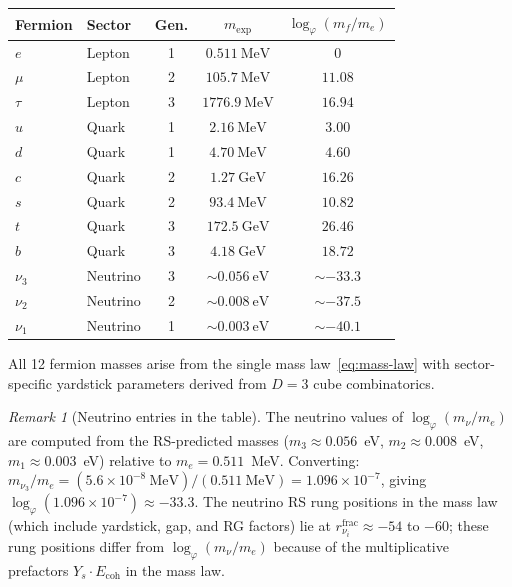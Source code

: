 \documentclass[12pt,a4paper]{article}
\theoremstyle{definition}
\theoremstyle{remark}
\newtheorem{remark}[theorem]{Remark}
\begin{document}
\begin{center}
\renewcommand{\arraystretch}{1.3}
\begin{tabular}{@{}llccc@{}}
\toprule
\textbf{Fermion} & \textbf{Sector} & \textbf{Gen.} &
\textbf{$m_{\mathrm{exp}}$} &
\textbf{$\log_\varphi(m_f/m_e)$} \\
\midrule
$e$ & Lepton & 1 & $0.511~\mathrm{MeV}$ & 0 \\
$\mu$ & Lepton & 2 & $105.7~\mathrm{MeV}$ & $11.08$ \\
$\tau$ & Lepton & 3 & $1776.9~\mathrm{MeV}$ & $16.94$ \\
\midrule
$u$ & Quark & 1 & $2.16~\mathrm{MeV}$ & $3.00$ \\
$d$ & Quark & 1 & $4.70~\mathrm{MeV}$ & $4.60$ \\
$c$ & Quark & 2 & $1.27~\mathrm{GeV}$ & $16.26$ \\
$s$ & Quark & 2 & $93.4~\mathrm{MeV}$ & $10.82$ \\
$t$ & Quark & 3 & $172.5~\mathrm{GeV}$ & $26.46$ \\
$b$ & Quark & 3 & $4.18~\mathrm{GeV}$ & $18.72$ \\
\midrule
$\nu_3$ & Neutrino & 3 & $\sim 0.056~\mathrm{eV}$ &
$\sim -33.3$ \\
$\nu_2$ & Neutrino & 2 & $\sim 0.008~\mathrm{eV}$ &
$\sim -37.5$ \\
$\nu_1$ & Neutrino & 1 & $\sim 0.003~\mathrm{eV}$ &
$\sim -40.1$ \\
\bottomrule
\end{tabular}
\end{center}

All 12 fermion masses arise from the single mass
law~\eqref{eq:mass-law} with sector-specific yardstick
parameters derived from $D = 3$ cube combinatorics.

\begin{remark}[Neutrino entries in the table]
The neutrino values of $\log_\varphi(m_\nu/m_e)$ are computed
from the RS-predicted masses ($m_3 \approx 0.056$~eV,
$m_2 \approx 0.008$~eV, $m_1 \approx 0.003$~eV) relative to
$m_e = 0.511$~MeV.  Converting: $m_{\nu_3}/m_e =
(5.6 \times 10^{-8}~\mathrm{MeV})/(0.511~\mathrm{MeV}) =
1.096 \times 10^{-7}$, giving
$\log_\varphi(1.096 \times 10^{-7}) \approx -33.3$.  The
neutrino RS rung positions in the mass law (which include
yardstick, gap, and RG factors) lie at $r^{\mathrm{frac}}_{\nu_i}
\approx -54$ to $-60$; these rung positions differ from
$\log_\varphi(m_\nu/m_e)$ because of the multiplicative
prefactors $Y_s \cdot E_{\mathrm{coh}}$ in the mass law.
\end{remark}
\end{document}
